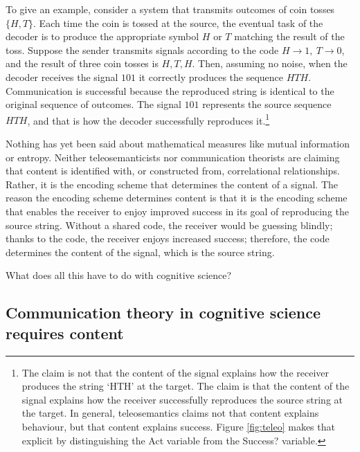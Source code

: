 \documentclass[12pt]{article}
\begin{document}
% 

To give an example, consider a system that transmits outcomes of coin tosses $\{H,T\}$.
Each time the coin is tossed at the source, the eventual task of the decoder is to produce the appropriate symbol $H$ or $T$ matching the result of the toss.
Suppose the sender transmits signals according to the code $H\rightarrow1,\ T\rightarrow0$, and the result of three coin tosses is $H, T, H$.
Then, assuming no noise, when the decoder receives the signal $101$ it correctly produces the sequence $HTH$.
Communication is successful because the reproduced string is identical to the original sequence of outcomes.
The signal $101$ represents the source sequence $HTH$, and that is how the decoder successfully reproduces it.\footnote{The claim is not that the content of the signal explains how the receiver produces the string `HTH' at the target. The claim is that the content of the signal explains how the receiver successfully reproduces the source string at the target. In general, teleosemantics claims not that content explains behaviour, but that content explains success. Figure \ref{fig:teleo} makes that explicit by distinguishing the Act variable from the Success? variable.}

Nothing has yet been said about mathematical measures like mutual information or entropy.
Neither teleosemanticists nor communication theorists are claiming that content is identified with, or constructed from, correlational relationships.
Rather, it is the encoding scheme that determines the content of a signal.
The reason the encoding scheme determines content is that it is the encoding scheme that enables the receiver to enjoy improved success in its goal of reproducing the source string.
Without a shared code, the receiver would be guessing blindly; thanks to the code, the receiver enjoys increased success; therefore, the code determines the content of the signal, which is the source string.

What does all this have to do with cognitive science?

\subsection{Communication theory in cognitive science requires content}
\end{document}
